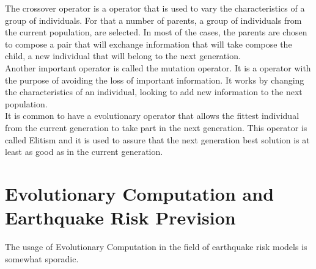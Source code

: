 The crossover operator is a operator that is used to vary the characteristics of a group of individuals. For that a number of parents, a group of individuals from the current population, are selected. In most of the cases, the parents are chosen to compose a pair that will exchange information that will take compose the child, a new individual that will belong to the next generation.\\

Another important operator is called the mutation operator. It is a operator with the purpose of avoiding the loss of important information. It works by changing the characteristics of an individual, looking to add new information to the next population.\\

It is common to have a evolutionary operator that allows the fittest individual from the current generation to take part in the next generation. This operator is called Elitism and it is used to assure that the next generation best solution is at least as good as in the current generation.\\

\section{Evolutionary Computation and Earthquake Risk Prevision}
The usage of Evolutionary Computation in the field of earthquake risk models is somewhat sporadic.\\



